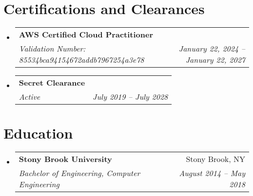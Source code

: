 \documentclass[letterpaper,11pt]{article}
\makeatletter
\newcommand{\resumeItem}[1]{
  \item\small{
    {#1 \vspace{-2pt}}
  }
}
\newcommand{\resumeSubheading}[4]{
  \vspace{-2pt}\item
    \begin{tabular*}{0.97\textwidth}[t]{l@{\extracolsep{\fill}}r}
      \textbf{#1} & #2 \\
      \textit{\small#3} & \textit{\small #4} \\
    \end{tabular*}\vspace{-7pt}
}
\newcommand{\resumeProjectHeading}[2]{
    \item
    \begin{tabular*}{0.97\textwidth}{l@{\extracolsep{\fill}}r}
      \small#1 & #2 \\
    \end{tabular*}\vspace{-7pt}
}
\newcommand{\resumeSubHeadingListStart}{\begin{itemize}[leftmargin=0.15in, label={}]}
\newcommand{\resumeSubHeadingListEnd}{\end{itemize}}
\newcommand{\resumeItemListStart}{\begin{itemize}}
\newcommand{\resumeItemListEnd}{\end{itemize}\vspace{-5pt}}
\makeatother
\begin{document}

\section{Certifications and Clearances}
  \resumeSubHeadingListStart
    \resumeSubheading
      {AWS Certified Cloud Practitioner}{}
      {Validation Number: 85534bca94154672addb7967254a3e78}{January 22, 2024 -- January 22, 2027}    
    \resumeSubheading
      {Secret Clearance}{}
      {Active}{July 2019 -- July 2028}
  \resumeSubHeadingListEnd


\section{Education}
  \resumeSubHeadingListStart
    \resumeSubheading
      {Stony Brook University}{Stony Brook, NY}
      {Bachelor of Engineering, Computer Engineering}{August 2014 -- May 2018}
  \resumeSubHeadingListEnd



\end{document}
